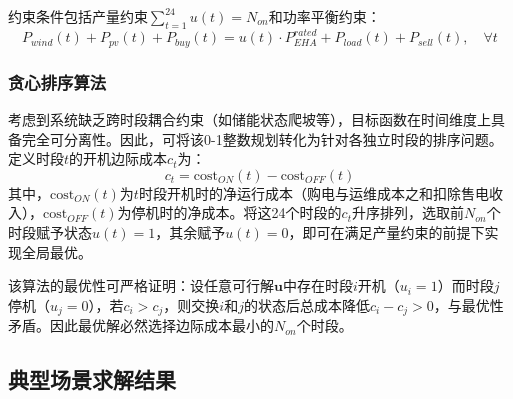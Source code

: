 约束条件包括产量约束$\sum_{t=1}^{24} u(t) = N_{on}$和功率平衡约束：
\begin{equation}
P_{wind}(t) + P_{pv}(t) + P_{buy}(t) = u(t) \cdot P_{EHA}^{rated} + P_{load}(t) + P_{sell}(t), \quad \forall t
\end{equation}

\subsubsection{贪心排序算法}
考虑到系统缺乏跨时段耦合约束（如储能状态爬坡等），目标函数在时间维度上具备完全可分离性。因此，可将该0-1整数规划转化为针对各独立时段的排序问题。定义时段$t$的开机边际成本$c_t$为：$$c_t = \text{cost}_{ON}(t) - \text{cost}_{OFF}(t)$$其中，$\text{cost}_{ON}(t)$为$t$时段开机时的净运行成本（购电与运维成本之和扣除售电收入），$\text{cost}_{OFF}(t)$为停机时的净成本。将这24个时段的$c_t$升序排列，选取前$N_{on}$个时段赋予状态$u(t)=1$，其余赋予$u(t)=0$，即可在满足产量约束的前提下实现全局最优。


该算法的最优性可严格证明：设任意可行解$\mathbf{u}$中存在时段$i$开机（$u_i=1$）而时段$j$停机（$u_j=0$），若$c_i > c_j$，则交换$i$和$j$的状态后总成本降低$c_i - c_j > 0$，与最优性矛盾。因此最优解必然选择边际成本最小的$N_{on}$个时段。

\subsection{典型场景求解结果}

\begin{table}[H]
\centering
\caption{典型场景各产量最优方案对比}\label{tab:q2_typical}
\end{table}

